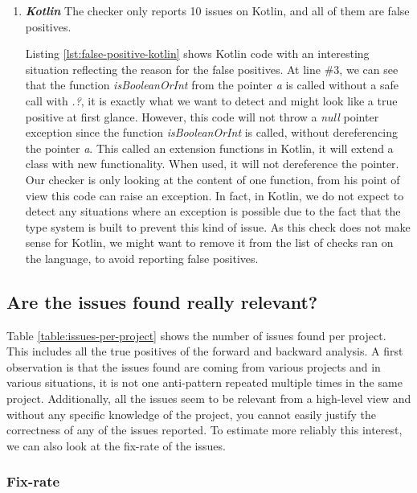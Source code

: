 \begin{enumerate}
	\item \textbf{\textit{Kotlin}}
	The checker only reports 10 issues on Kotlin, and all of them are false positives.
	
	
	
	Listing \ref{lst:false-positive-kotlin} shows Kotlin code with an interesting situation reflecting the reason for the false positives. 
	At line $\#3$, we can see that the function \emph{isBooleanOrInt} from the pointer \emph{a} is called without a safe call with \emph{.?}, it is exactly what we want to detect and might look like a true positive at first glance. 
	However, this code will not throw a \emph{null} pointer exception since the function \emph{isBooleanOrInt} is called, without dereferencing the pointer \emph{a}.
	This called an extension functions \cite{kotlinExtensionFun:2019:Online} in Kotlin, it will extend a class with new functionality. 
	When used, it will not dereference the pointer.
	Our checker is only looking at the content of one function, from his point of view this code can raise an exception.
	In fact, in Kotlin, we do not expect to detect any situations where an exception is possible due to the fact that the type system is built to prevent this kind of issue.
	As this check does not make sense for Kotlin, we might want to remove it from the list of checks ran on the language, to avoid reporting false positives.
\end{enumerate}

\subsection{Are the issues found really relevant?}
\label{subsec:are_the_issues_relevant}

Table \ref{table:issues-per-project} shows the number of issues found per project. 
This includes all the true positives of the forward and backward analysis. 
A first observation is that the issues found are coming from various projects and in various situations, it is not one anti-pattern repeated multiple times in the same project. 
Additionally, all the issues seem to be relevant from a high-level view and without any specific knowledge of the project, you cannot easily justify the correctness of any of the issues reported.
To estimate more reliably this interest, we can also look at the fix-rate of the issues.

\subsubsection{Fix-rate}
\label{subsubsec:fix_rate}


